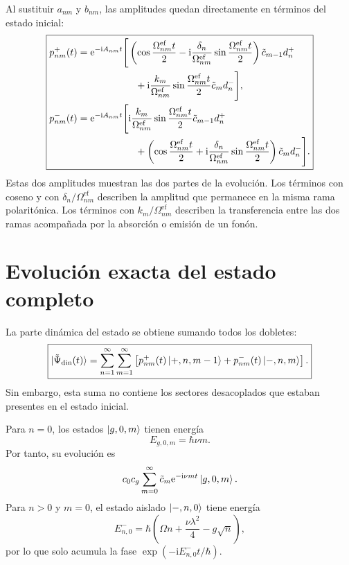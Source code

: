 \documentclass[11pt]{article}
\newcommand{\ii}{\mathrm{i}}
\newcommand{\ee}{\mathrm{e}}
\begin{document}
Al sustituir $a_{nm}$ y $b_{nm}$, las amplitudes quedan directamente en
t\'erminos del estado inicial:
\begin{equation}
  \boxed{
  \begin{aligned}
  p_{nm}^{+}(t)
  &=
  \ee^{-\ii A_{nm}t}
  \Bigg[
  \left(
  \cos\frac{\Omega_{nm}^{\mathrm{ef}}t}{2}
  -
  \ii\frac{\delta_n}{\Omega_{nm}^{\mathrm{ef}}}
  \sin\frac{\Omega_{nm}^{\mathrm{ef}}t}{2}
  \right)
  \tilde c_{m-1}d_n^+
  \\
  &\hspace{2.1cm}+
  \ii\frac{k_m}{\Omega_{nm}^{\mathrm{ef}}}
  \sin\frac{\Omega_{nm}^{\mathrm{ef}}t}{2}
  \tilde c_md_n^-
  \Bigg],
  \\
  p_{nm}^{-}(t)
  &=
  \ee^{-\ii A_{nm}t}
  \Bigg[
  \ii\frac{k_m}{\Omega_{nm}^{\mathrm{ef}}}
  \sin\frac{\Omega_{nm}^{\mathrm{ef}}t}{2}
  \tilde c_{m-1}d_n^+
  \\
  &\hspace{2.1cm}+
  \left(
  \cos\frac{\Omega_{nm}^{\mathrm{ef}}t}{2}
  +
  \ii\frac{\delta_n}{\Omega_{nm}^{\mathrm{ef}}}
  \sin\frac{\Omega_{nm}^{\mathrm{ef}}t}{2}
  \right)
  \tilde c_md_n^-
  \Bigg].
  \end{aligned}
  }
\end{equation}
Estas dos amplitudes muestran las dos partes de la evoluci\'on. Los t\'erminos
con coseno y con $\delta_n/\Omega_{nm}^{\mathrm{ef}}$ describen la amplitud
que permanece en la misma rama polarit\'onica. Los t\'erminos con
$k_m/\Omega_{nm}^{\mathrm{ef}}$ describen la transferencia entre las dos
ramas acompa\~nada por la absorci\'on o emisi\'on de un fon\'on.

\section{Evoluci\'on exacta del estado completo}

La parte din\'amica del estado se obtiene sumando todos los dobletes:
\begin{equation}
  \boxed{
  \ket{\tilde\Psi_{\mathrm{din}}(t)}
  =
  \sum_{n=1}^{\infty}\sum_{m=1}^{\infty}
  \left[
  p_{nm}^{+}(t)\ket{+,n,m-1}
  +
  p_{nm}^{-}(t)\ket{-,n,m}
  \right].
  }
\end{equation}
Sin embargo, esta suma no contiene los sectores desacoplados que estaban
presentes en el estado inicial.

Para $n=0$, los estados $\ket{g,0,m}$ tienen energ\'ia
\begin{equation}
  E_{g,0,m}=\hbar\nu m.
\end{equation}
Por tanto, su evoluci\'on es
\begin{equation}
  c_0c_g
  \sum_{m=0}^{\infty}
  \tilde c_m
  \ee^{-\ii\nu mt}
  \ket{g,0,m}.
\end{equation}
Para $n>0$ y $m=0$, el estado aislado $\ket{-,n,0}$ tiene energ\'ia
\begin{equation}
  E_{n,0}^{-}
  =
  \hbar
  \left(
  \Omega n+\frac{\nu\lambda^2}{4}-g\sqrt n
  \right),
\end{equation}
por lo que solo acumula la fase
$\exp(-\ii E_{n,0}^{-}t/\hbar)$.
\end{document}
